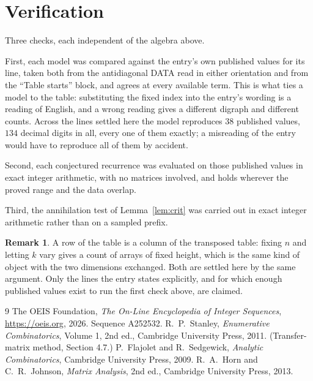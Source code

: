 \documentclass[11pt,a4paper]{article}
\theoremstyle{plain}
\theoremstyle{definition}
\newtheorem{remark}[theorem]{Remark}
\begin{document}
\section{Verification}

Three checks, each independent of the algebra above.

First, each model was compared against the entry's own published values for its line, taken
both from the antidiagonal DATA read in either orientation and from the ``Table starts''
block, and agrees at every available term. This is what ties a model to the table:
substituting the fixed index into the entry's wording is a reading of English, and a wrong
reading gives a different digraph and different counts. Across the lines settled here the
model reproduces $38$ published values, $134$ decimal digits in all, every one of
them exactly; a misreading of the entry would have to reproduce all of them by accident.

Second, each conjectured recurrence was evaluated on those published values in exact
integer arithmetic, with no matrices involved, and holds wherever the proved range and the
data overlap.

Third, the annihilation test of Lemma~\ref{lem:crit} was carried out in exact integer
arithmetic rather than on a sampled prefix.

\begin{remark}
A row of the table is a column of the transposed table: fixing $n$ and letting $k$ vary gives a
count of arrays of fixed height, which is the same kind of object with the two dimensions
exchanged. Both are settled here by the same argument. Only the lines the entry states
explicitly, and for which enough published values exist to run the first check above, are
claimed.
\end{remark}

\begin{thebibliography}{9}
 The OEIS Foundation, \emph{The On-Line Encyclopedia of Integer
Sequences}, \url{https://oeis.org}, 2026. Sequence A252532.
 R.~P.~Stanley, \emph{Enumerative Combinatorics}, Volume 1, 2nd ed.,
Cambridge University Press, 2011. (Transfer-matrix method, Section 4.7.)
 P.~Flajolet and R.~Sedgewick, \emph{Analytic Combinatorics}, Cambridge
University Press, 2009.
 R.~A.~Horn and C.~R.~Johnson, \emph{Matrix Analysis}, 2nd ed., Cambridge
University Press, 2013.
\end{thebibliography}
\end{document}
